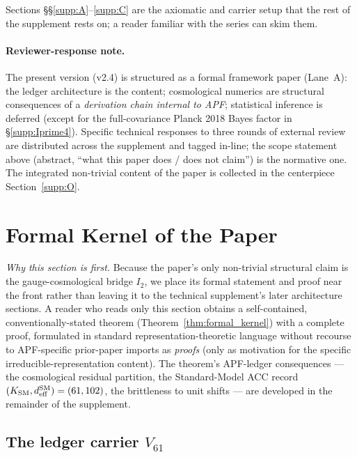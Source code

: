 \documentclass[11pt]{article}
\theoremstyle{plain}
\theoremstyle{definition}
\theoremstyle{remark}
\begin{document}
\noindent Sections \S\S\ref{supp:A}--\ref{supp:C} are the axiomatic and carrier setup that the rest of the supplement rests on; a reader familiar with the series can skim them.

\paragraph{Reviewer-response note.}  The present version (v2.4) is structured as a formal framework paper (Lane~A): the ledger architecture is the content; cosmological numerics are structural consequences of a \emph{derivation chain internal to APF}; statistical inference is deferred (except for the full-covariance Planck 2018 Bayes factor in \S\ref{supp:Iprime4}).  Specific technical responses to three rounds of external review are distributed across the supplement and tagged in-line; the scope statement above (abstract, ``what this paper does / does not claim'') is the normative one.  The integrated non-trivial content of the paper is collected in the centerpiece Section~\ref{supp:O}.

\newpage

\section{Formal Kernel of the Paper}\label{supp:kernel}

\noindent\textit{Why this section is first.}  Because the paper's only non-trivial structural claim is the gauge-cosmological bridge $I_2$, we place its formal statement and proof near the front rather than leaving it to the technical supplement's later architecture sections.  A reader who reads only this section obtains a self-contained, conventionally-stated theorem (Theorem~\ref{thm:formal_kernel}) with a complete proof, formulated in standard representation-theoretic language without recourse to APF-specific prior-paper imports as \emph{proofs} (only as motivation for the specific irreducible-representation content).  The theorem's APF-ledger consequences --- the cosmological residual partition, the Standard-Model ACC record $(K_{\rm SM}, d_{\rm eff}^{\rm SM}) = (61, 102)$, the brittleness to unit shifts --- are developed in the remainder of the supplement.

\bigskip

\subsection{The ledger carrier $V_{61}$}\label{supp:kernel_V61}
\end{document}
